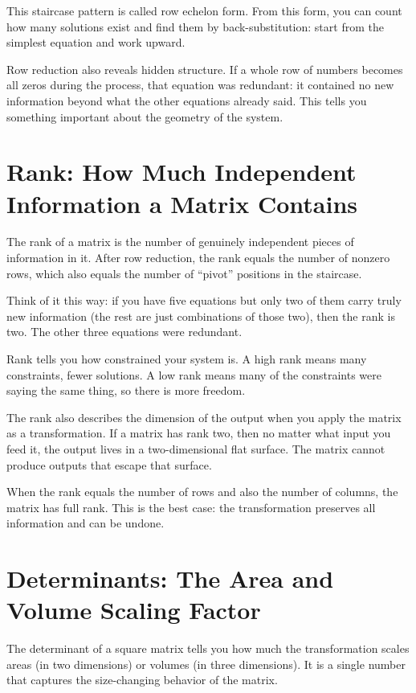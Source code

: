 \documentclass[11pt]{article}
\begin{document}
This staircase pattern is called row echelon form. From this form, you can count how many solutions exist and find them by back-substitution: start from the simplest equation and work upward.

Row reduction also reveals hidden structure. If a whole row of numbers becomes all zeros during the process, that equation was redundant: it contained no new information beyond what the other equations already said. This tells you something important about the geometry of the system.

\section*{Rank: How Much Independent Information a Matrix Contains}

The rank of a matrix is the number of genuinely independent pieces of information in it. After row reduction, the rank equals the number of nonzero rows, which also equals the number of ``pivot'' positions in the staircase.

Think of it this way: if you have five equations but only two of them carry truly new information (the rest are just combinations of those two), then the rank is two. The other three equations were redundant.

Rank tells you how constrained your system is. A high rank means many constraints, fewer solutions. A low rank means many of the constraints were saying the same thing, so there is more freedom.

The rank also describes the dimension of the output when you apply the matrix as a transformation. If a matrix has rank two, then no matter what input you feed it, the output lives in a two-dimensional flat surface. The matrix cannot produce outputs that escape that surface.

When the rank equals the number of rows and also the number of columns, the matrix has full rank. This is the best case: the transformation preserves all information and can be undone.

\section*{Determinants: The Area and Volume Scaling Factor}

The determinant of a square matrix tells you how much the transformation scales areas (in two dimensions) or volumes (in three dimensions). It is a single number that captures the size-changing behavior of the matrix.
\end{document}
